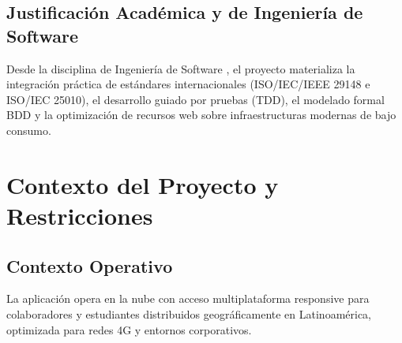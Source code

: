 \documentclass[11pt,a4paper]{article}
\begin{document}
\subsection{Justificación Académica y de Ingeniería de Software}
Desde la disciplina de Ingeniería de Software \cite{sommerville2011, pressman2010}, el proyecto materializa la integración práctica de estándares internacionales (ISO/IEC/IEEE 29148 e ISO/IEC 25010), el desarrollo guiado por pruebas (TDD), el modelado formal BDD y la optimización de recursos web sobre infraestructuras modernas de bajo consumo.

\section{Contexto del Proyecto y Restricciones}
\subsection{Contexto Operativo}
La aplicación opera en la nube con acceso multiplataforma responsive para colaboradores y estudiantes distribuidos geográficamente en Latinoamérica, optimizada para redes 4G y entornos corporativos.
\end{document}
